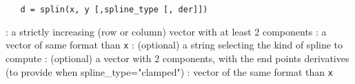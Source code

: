 
\begin{mandesc}
\end{mandesc}

\begin{calling_sequence}
  \begin{verbatim}
   d = splin(x, y [,spline_type [, der]])
  \end{verbatim}
\end{calling_sequence}


\begin{parameters}
  \begin{varlist}
    : a strictly increasing (row or column) vector with at least 2 components
    : a vector of same format than \verb!x!
    : (optional) a string selecting the kind of spline to compute
    : (optional) a vector with 2 components, with the end points derivatives (to 
               provide when spline\_type="clamped")
    : vector of the same format than \verb!x!
  \end{varlist}
  \end{parameters}

